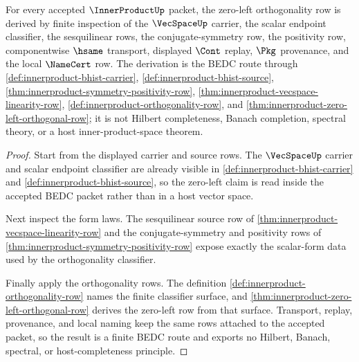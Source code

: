 \begin{theorem}
\label{thm:innerproduct-finite-orthogonality-derivation}
For every accepted $\InnerProductUp$ packet, the zero-left orthogonality row is derived by finite inspection of the $\VecSpaceUp$ carrier, the scalar endpoint classifier, the sesquilinear rows, the conjugate-symmetry row, the positivity row, componentwise $\hsame$ transport, displayed $\Cont$ replay, $\Pkg$ provenance, and the local $\NameCert$ row. The derivation is the BEDC route through \autoref{def:innerproduct-bhist-carrier}, \autoref{def:innerproduct-bhist-source}, \autoref{thm:innerproduct-symmetry-positivity-row}, \autoref{thm:innerproduct-vecspace-linearity-row}, \autoref{def:innerproduct-orthogonality-row}, and \autoref{thm:innerproduct-zero-left-orthogonal-row}; it is not Hilbert completeness, Banach completion, spectral theory, or a host inner-product-space theorem.
\end{theorem}
\begin{proof}
Start from the displayed carrier and source rows. The $\VecSpaceUp$ carrier and scalar endpoint classifier are already visible in \autoref{def:innerproduct-bhist-carrier} and \autoref{def:innerproduct-bhist-source}, so the zero-left claim is read inside the accepted BEDC packet rather than in a host vector space.

Next inspect the form laws. The sesquilinear source row of \autoref{thm:innerproduct-vecspace-linearity-row} and the conjugate-symmetry and positivity rows of \autoref{thm:innerproduct-symmetry-positivity-row} expose exactly the scalar-form data used by the orthogonality classifier.

Finally apply the orthogonality rows. The definition \autoref{def:innerproduct-orthogonality-row} names the finite classifier surface, and \autoref{thm:innerproduct-zero-left-orthogonal-row} derives the zero-left row from that surface. Transport, replay, provenance, and local naming keep the same rows attached to the accepted packet, so the result is a finite BEDC route and exports no Hilbert, Banach, spectral, or host-completeness principle.
\end{proof}

